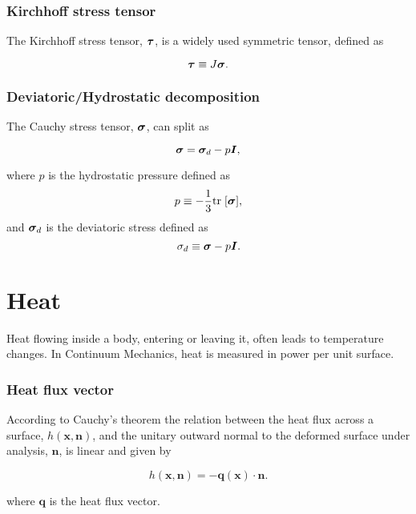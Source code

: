 \subsubsection{Kirchhoff stress tensor}

The Kirchhoff stress tensor, $\bm{\tau}$, is a widely used symmetric tensor, defined as
\begin{highlight}
    \begin{equation}
        \bm{\tau} \equiv J\bm{\sigma}.
    \end{equation}
\end{highlight}

\subsubsection{Deviatoric/Hydrostatic decomposition}

The Cauchy stress tensor, $\bm{\sigma}$, can split as
\begin{highlight}
    \begin{equation}
        \bm{\sigma} = \bm{\sigma}_d - p\bm{I},
    \end{equation}
\end{highlight}
where $p$ is the hydrostatic pressure defined as
\begin{equation}
    p \equiv -\frac{1}{3}\text{tr}\;[\bm{\sigma}],
\end{equation}
and $\bm{\sigma}_d$ is the deviatoric stress defined as
\begin{equation}
    \sigma_d \equiv \bm{\sigma} - p\bm{I}.
\end{equation}

\section{Heat}

Heat flowing inside a body, entering or leaving it, often leads to temperature changes.
In Continuum Mechanics, heat is measured in power per unit surface.

\subsubsection{Heat flux vector}

According to Cauchy's theorem the relation between the heat flux across a surface, \(h(\bm x, \bm n)\), and the unitary outward normal to the deformed surface under analysis, \(\bm n\), is linear and given by
\begin{highlight}
  \begin{equation}
    h(\bm x, \bm n ) = -\bm q(\bm x)\cdot \bm n.
  \end{equation}
\end{highlight}
where \(\bm q\) is the heat flux vector.

